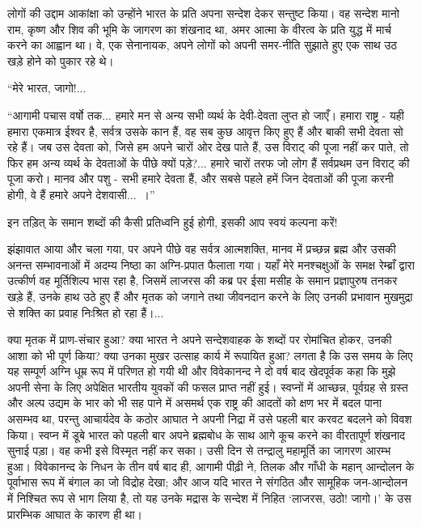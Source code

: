 लोगों की उद्दाम आकांक्षा को उन्होंने भारत के प्रति अपना सन्देश देकर सन्तुष्ट किया। वह सन्देश मानो राम, कृष्ण और शिव की भूमि के जागरण का शंखनाद था, अमर आत्मा के वीरत्व के प्रति युद्ध में मार्च करने का आह्वान था। वे, एक सेनानायक, अपने लोगों को अपनी समर-नीति सुझाते हुए एक साथ उठ खड़े होने को पुकार रहे थे। 

“मेरे भारत, जागो!... 

“आगामी पचास वर्षो तक... हमारे मन से अन्य सभी व्यर्थ के देवी-देवता लुप्त हो जाएँ। हमारा राष्ट्र - यही हमारा एकमात्र ईश्वर है, सर्वत्र उसके कान हैं, वह सब कुछ आवृत्त किए हुए हैं और बाकी सभी देवता सो रहे हैं। जब उस देवता को, जिसे हम अपने चारों ओर देख पाते हैं, उस विराट् की पूजा नहीं कर पाते, तो फिर हम अन्य व्यर्थ के देवताओं के पीछे क्यों पड़े?... हमारे चारों तरफ जो लोग हैं सर्वप्रथम उन विराट् की पूजा करो। मानव और पशु - सभी हमारे देवता हैं, और सबसे पहले हमें जिन देवताओं की पूजा करनी होगी, वे हैं हमारे अपने देशवासी...~।” 

इन तड़ित् के समान शब्दों की कैसी प्रतिध्वनि हुई होगी, इसकी आप स्वयं कल्पना करें! 

झंझावात आया और चला गया, पर अपने पीछे वह सर्वत्र आत्मशक्ति, मानव में प्रच्छन्न ब्रह्म और उसकी अनन्त सम्भावनाओं में अदम्य निष्ठा का अग्नि-प्रपात फैलाता गया। यहाँ मेरे मनश्चक्षुओं के समक्ष रेम्ब्राँ द्वारा उत्कीर्ण वह मूर्तिशिल्प भास रहा है, जिसमें लाजरस की कब्र पर ईसा मसीह के समान प्रज्ञापुरुष तनकर खड़े हैं, उनके हाथ उठे हुए हैं और मृतक को जगाने तथा जीवनदान करने के लिए उनकी प्रभावान मुखमुद्रा से शक्ति का प्रवाह निःश्रित हो रहा हैं।... 

क्या मृतक में प्राण-संचार हुआ? क्या भारत ने अपने सन्देशवाहक के शब्दों पर रोमांचित होकर, उनकी आशा को भी पूर्ण किया? क्या उनका मुखर उत्साह कार्य में रूपायित हुआ? लगता है कि उस समय के लिए यह सम्पूर्ण अग्नि धूम्र रूप में परिणत हो गयी थी और विवेकानन्द ने दो वर्ष बाद खेदपूर्वक कहा कि मुझे अपनी सेना के लिए अपेक्षित भारतीय युवकों की फसल प्राप्त नहीं हुई। स्वप्नों में आच्छन्न, पूर्वग्रह से ग्रस्त और अल्प उद्यम के भार को भी सह पाने में असमर्थ एक राष्ट्र की आदतों को क्षण भर में बदल पाना असम्भव था, परन्तु आचार्यदेव के कठोर आघात ने अपनी निद्रा में उसे पहली बार करवट बदलने को विवश किया। स्वप्न में डूबे भारत को पहली बार अपने ब्रह्मबोध के साथ आगे कूच करने का वीरतापूर्ण शंखनाद सुनाई पड़ा। वह कभी इसे विस्मृत नहीं कर सका। उसी दिन से तन्द्रालु महामूर्ति का जागरण आरम्भ हुआ। विवेकानन्द के निधन के तीन वर्ष बाद ही, आगामी पीढ़ी ने, तिलक और गाँधी के महान् आन्दोलन के पूर्वाभास रूप में बंगाल का जो विद्रोह देखा; और आज यदि भारत ने संगठित और सामूहिक जन-आन्दोलन में निश्चित रूप से भाग लिया है, तो यह उनके मद्रास के सन्देश में निहित ‘लाजरस, उठो! जागो।’ के उस प्रारम्भिक आघात के कारण ही था। 

